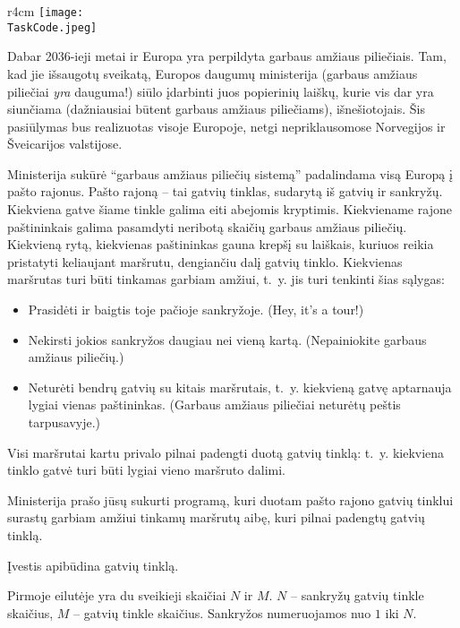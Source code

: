 \documentclass{boi2014-lt}
\renewcommand{\TaskCode}{postmen}
\begin{document}
    \begin{wrapfigure}[8]{r}{4cm}
        \vspace{-18pt}
		\texttt{[image: \\TaskCode.jpeg]}
	\end{wrapfigure}
    Dabar 2036-ieji metai ir Europa yra perpildyta garbaus amžiaus piliečiais.
    Tam, kad jie išsaugotų sveikatą, Europos daugumų ministerija (garbaus amžiaus
    piliečiai \emph{yra} dauguma!) siūlo įdarbinti juos popierinių laiškų,
    kurie vis dar yra siunčiama (dažniausiai būtent garbaus amžiaus piliečiams),
    išnešiotojais. Šis pasiūlymas bus realizuotas visoje Europoje, netgi
    nepriklausomose Norvegijos ir Šveicarijos valstijose.

    Ministerija sukūrė ``garbaus amžiaus piliečių sistemą'' padalindama visą
    Europą į pašto rajonus. Pašto rajoną -- tai gatvių tinklas, sudarytą iš
    gatvių ir sankryžų. Kiekviena gatve šiame tinkle galima eiti abejomis
    kryptimis. Kiekviename rajone paštininkais galima pasamdyti neribotą skaičių
    garbaus amžiaus piliečių. Kiekvieną rytą, kiekvienas paštininkas gauna krepšį
    su laiškais, kuriuos reikia pristatyti keliaujant maršrutu, dengiančiu dalį
    gatvių tinklo. Kiekvienas maršrutas turi būti tinkamas garbiam amžiui, t.~y.
    jis turi tenkinti šias sąlygas:
    \begin{itemize}
        \item Prasidėti ir baigtis toje pačioje sankryžoje. (Hey, it’s a tour!)
        \item Nekirsti jokios sankryžos daugiau nei vieną kartą. (Nepainiokite
            garbaus amžiaus piliečių.)
        \item Neturėti bendrų gatvių su kitais maršrutais, t.~y. kiekvieną gatvę
            aptarnauja lygiai vienas paštininkas. (Garbaus amžiaus piliečiai
            neturėtų peštis tarpusavyje.)
    \end{itemize}

    Visi maršrutai kartu privalo pilnai padengti duotą gatvių tinklą: t.~y.
    kiekviena tinklo gatvė turi būti lygiai vieno maršruto dalimi.

    \Task
    Ministerija prašo jūsų sukurti programą, kuri duotam pašto rajono gatvių
    tinklui surastų garbiam amžiui tinkamų maršrutų aibę, kuri pilnai padengtų
    gatvių tinklą.

    \Input
    Įvestis apibūdina gatvių tinklą.
    
    Pirmoje eilutėje yra du sveikieji skaičiai $N$ ir $M$. $N$ -- sankryžų gatvių
    tinkle skaičius, $M$ -- gatvių tinkle skaičius. Sankryžos numeruojamos nuo
    $1$ iki $N$.
\end{document}
